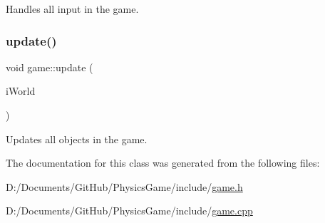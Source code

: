 Handles all input in the game. 

\mbox{\label{classgame_aaac7fea645c92fd364bdccb24d59efd2}} 
\subsubsection{\texorpdfstring{update()}{update()}}
{\footnotesize\ttfamily void game\+::update (\begin{DoxyParamCaption}\item[{b2\+World \&}]{i\+World }\end{DoxyParamCaption})\hspace{0.3cm}{\ttfamily [virtual]}}



Updates all objects in the game. 



The documentation for this class was generated from the following files\+:\begin{DoxyCompactItemize}
\item 
D\+:/\+Documents/\+Git\+Hub/\+Physics\+Game/include/\hyperlink{game_8h}{game.\+h}\item 
D\+:/\+Documents/\+Git\+Hub/\+Physics\+Game/include/\hyperlink{game_8cpp}{game.\+cpp}\end{DoxyCompactItemize}

